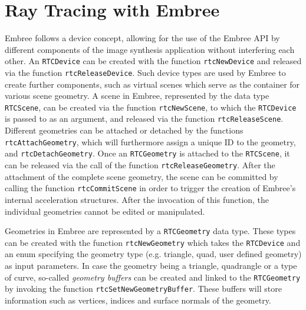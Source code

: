 
\section{Ray Tracing with Embree}
\label{sec:embree_raytracing}
Embree follows a device concept, allowing for the use of the Embree API by different components of the image synthesis application without interfering each other. An \texttt{RTCDevice} can be created with the function \texttt{rtcNewDevice} and released via the function \texttt{rtcReleaseDevice}. Such device types are used by Embree to create further components, such as virtual scenes which serve as the container for various scene geometry. A scene in Embree, represented by the data type \texttt{RTCScene}, can be created via the function \texttt{rtcNewScene}, to which the \texttt{RTCDevice} is passed to as an argument, and released via the function \texttt{rtcReleaseScene}. Different geometries can be attached or detached by the functions \texttt{rtcAttachGeometry}, which will furthermore assign a unique ID to the geometry, and \texttt{rtcDetachGeometry}. Once an \texttt{RTCGeometry} is attached to the \texttt{RTCScene}, it can be released via the call of the function \texttt{rtcReleaseGeometry}.
After the attachment of the complete scene geometry, the scene can be committed by calling the function \texttt{rtcCommitScene} in order to trigger the creation of Embree's internal acceleration structures. After the invocation of this function, the individual geometries cannot be edited or manipulated.

Geometries in Embree are represented by a \texttt{RTCGeometry} data type. These types can be created with the function \texttt{rtcNewGeometry} which takes the \texttt{RTCDevice} and an enum specifying the geometry type (e.g. triangle, quad, user defined geometry) as input parameters. In case the geometry being a triangle, quadrangle or a type of curve, so-called \emph{geometry buffers} can be created and linked to the \texttt{RTCGeometry} by invoking the function \texttt{rtcSetNewGeometryBuffer}. These buffers will store information such as vertices, indices and surface normals of the geometry.  

